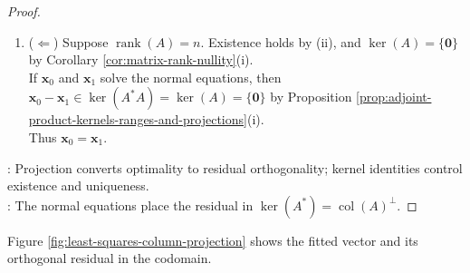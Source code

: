 \begin{theorem}
\begin{proof}
\begin{enumerate}[label=(\roman*)]
For $\mathbf{z}\in\ker(A)$, $A^*A(\mathbf{x}_0+\mathbf{z})=A^*A\mathbf{x}_0=A^*\mathbf{y}$, so $\mathbf{z}=\mathbf{0}$ by uniqueness. Thus $\dim(\ker(A))=0$ and $\operatorname{rank}(A)=n$ by Corollary \ref{cor:matrix-rank-nullity}(i).
\item[$(iii)$] ($\Leftarrow$) Suppose $\operatorname{rank}(A)=n$. Existence holds by (ii), and $\ker(A)=\{\mathbf{0}\}$ by Corollary \ref{cor:matrix-rank-nullity}(i).\\
If $\mathbf{x}_0$ and $\mathbf{x}_1$ solve the normal equations, then $\mathbf{x}_0-\mathbf{x}_1\in\ker(A^*A)=\ker(A)=\{\mathbf{0}\}$ by Proposition \ref{prop:adjoint-product-kernels-ranges-and-projections}(i).\\
Thus $\mathbf{x}_0=\mathbf{x}_1$.
\end{enumerate}
: Projection converts optimality to residual orthogonality; kernel identities control existence and uniqueness.\\
: The normal equations place the residual in $\ker(A^*)=\operatorname{col}(A)^{\perp}$.
\end{proof}
\end{theorem}

Figure \ref{fig:least-squares-column-projection} shows the fitted vector and its orthogonal residual in the codomain.
\begin{illustrationfigure}[H]
  \centering
  
  \caption{Fitted vector and residual: $A\mathbf{x}_0=P_{\operatorname{col}(A)}\mathbf{y}$ and $\mathbf{y}-A\mathbf{x}_0\in\operatorname{col}(A)^{\perp}=\ker(A^*)$.}
  \label{fig:least-squares-column-projection}
\end{illustrationfigure}

